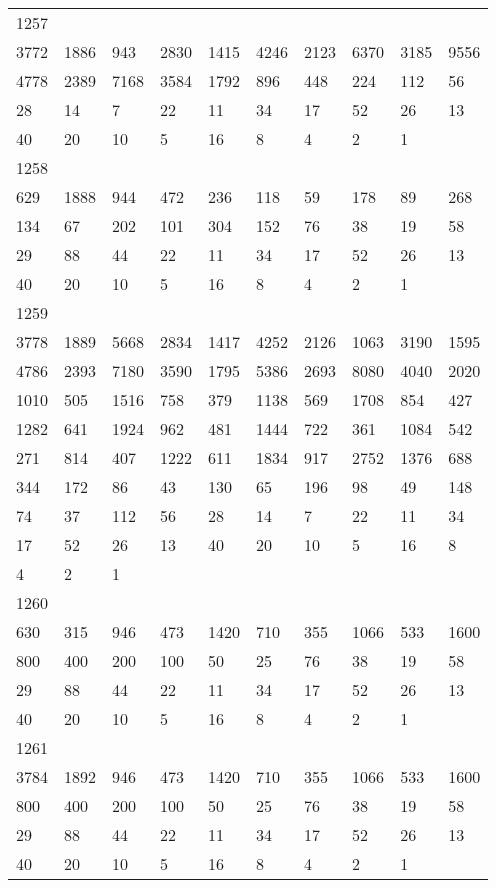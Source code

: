 \begin{longtable}{*{10}{l}}
1257&&&&&&&&&\\
3772& 1886& 943& 2830& 1415& 4246& 2123& 6370& 3185& 9556\\
4778& 2389& 7168& 3584& 1792& 896& 448& 224& 112& 56\\
28& 14& 7& 22& 11& 34& 17& 52& 26& 13\\
40& 20& 10& 5& 16& 8& 4& 2& 1& \\

1258&&&&&&&&&\\
629& 1888& 944& 472& 236& 118& 59& 178& 89& 268\\
134& 67& 202& 101& 304& 152& 76& 38& 19& 58\\
29& 88& 44& 22& 11& 34& 17& 52& 26& 13\\
40& 20& 10& 5& 16& 8& 4& 2& 1& \\

1259&&&&&&&&&\\
3778& 1889& 5668& 2834& 1417& 4252& 2126& 1063& 3190& 1595\\
4786& 2393& 7180& 3590& 1795& 5386& 2693& 8080& 4040& 2020\\
1010& 505& 1516& 758& 379& 1138& 569& 1708& 854& 427\\
1282& 641& 1924& 962& 481& 1444& 722& 361& 1084& 542\\
271& 814& 407& 1222& 611& 1834& 917& 2752& 1376& 688\\
344& 172& 86& 43& 130& 65& 196& 98& 49& 148\\
74& 37& 112& 56& 28& 14& 7& 22& 11& 34\\
17& 52& 26& 13& 40& 20& 10& 5& 16& 8\\
4& 2& 1& \\

1260&&&&&&&&&\\
630& 315& 946& 473& 1420& 710& 355& 1066& 533& 1600\\
800& 400& 200& 100& 50& 25& 76& 38& 19& 58\\
29& 88& 44& 22& 11& 34& 17& 52& 26& 13\\
40& 20& 10& 5& 16& 8& 4& 2& 1& \\

1261&&&&&&&&&\\
3784& 1892& 946& 473& 1420& 710& 355& 1066& 533& 1600\\
800& 400& 200& 100& 50& 25& 76& 38& 19& 58\\
29& 88& 44& 22& 11& 34& 17& 52& 26& 13\\
40& 20& 10& 5& 16& 8& 4& 2& 1& \\


\end{longtable}
